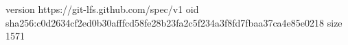 version https://git-lfs.github.com/spec/v1
oid sha256:c0d2634cf2ed0b30afffcd58fe28b23fa2c5f234a3f8fd7fbaa37ca4e85e0218
size 1571
